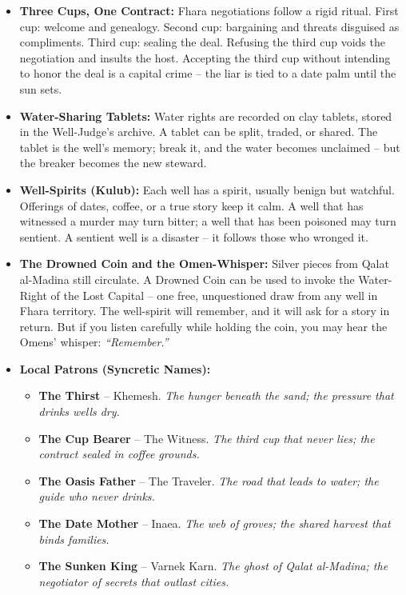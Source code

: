 \begin{itemize}
\item \textbf{Three Cups, One Contract:} Fhara negotiations follow a rigid ritual. First cup: welcome and genealogy. Second cup: bargaining and threats disguised as compliments. Third cup: sealing the deal. Refusing the third cup voids the negotiation and insults the host. Accepting the third cup without intending to honor the deal is a capital crime -- the liar is tied to a date palm until the sun sets.
\item \textbf{Water-Sharing Tablets:} Water rights are recorded on clay tablets, stored in the Well-Judge's archive. A tablet can be split, traded, or shared. The tablet is the well's memory; break it, and the water becomes unclaimed -- but the breaker becomes the new steward.
\item \textbf{Well-Spirits (Kulub):} Each well has a spirit, usually benign but watchful. Offerings of dates, coffee, or a true story keep it calm. A well that has witnessed a murder may turn bitter; a well that has been poisoned may turn sentient. A sentient well is a disaster -- it follows those who wronged it.
\item \textbf{The Drowned Coin and the Omen-Whisper:} Silver pieces from Qalat al-Madina still circulate. A Drowned Coin can be used to invoke the Water-Right of the Lost Capital -- one free, unquestioned draw from any well in Fhara territory. The well-spirit will remember, and it will ask for a story in return. But if you listen carefully while holding the coin, you may hear the Omens' whisper: \textit{``Remember.''}
\item \textbf{Local Patrons (Syncretic Names):}
  \begin{itemize}
    \item \textbf{The Thirst} -- Khemesh. \textit{The hunger beneath the sand; the pressure that drinks wells dry.}
    \item \textbf{The Cup Bearer} -- The Witness. \textit{The third cup that never lies; the contract sealed in coffee grounds.}
    \item \textbf{The Oasis Father} -- The Traveler. \textit{The road that leads to water; the guide who never drinks.}
    \item \textbf{The Date Mother} -- Inaea. \textit{The web of groves; the shared harvest that binds families.}
    \item \textbf{The Sunken King} -- Varnek Karn. \textit{The ghost of Qalat al-Madina; the negotiator of secrets that outlast cities.}
  \end{itemize}
\end{itemize}

